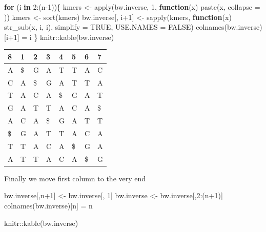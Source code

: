 \documentclass[
]{book}
\newenvironment{Shaded}{\begin{snugshade}}{\end{snugshade}}
\newcommand{\AttributeTok}[1]{\textcolor[rgb]{0.77,0.63,0.00}{#1}}
\newcommand{\ConstantTok}[1]{\textcolor[rgb]{0.00,0.00,0.00}{#1}}
\newcommand{\ControlFlowTok}[1]{\textcolor[rgb]{0.13,0.29,0.53}{\textbf{#1}}}
\newcommand{\DecValTok}[1]{\textcolor[rgb]{0.00,0.00,0.81}{#1}}
\newcommand{\FunctionTok}[1]{\textcolor[rgb]{0.00,0.00,0.00}{#1}}
\newcommand{\NormalTok}[1]{#1}
\newcommand{\OtherTok}[1]{\textcolor[rgb]{0.56,0.35,0.01}{#1}}
\newcommand{\SpecialCharTok}[1]{\textcolor[rgb]{0.00,0.00,0.00}{#1}}
\newcommand{\StringTok}[1]{\textcolor[rgb]{0.31,0.60,0.02}{#1}}
\begin{document}
\begin{Shaded}
\begin{Highlighting}[numbers=left,,]
\ControlFlowTok{for}\NormalTok{ (i }\ControlFlowTok{in} \DecValTok{2}\SpecialCharTok{:}\NormalTok{(n}\DecValTok{{-}1}\NormalTok{))\{}
\NormalTok{  kmers             }\OtherTok{\textless{}{-}} \FunctionTok{apply}\NormalTok{(bw.inverse, }\DecValTok{1}\NormalTok{, }
                             \ControlFlowTok{function}\NormalTok{(x) }\FunctionTok{paste}\NormalTok{(x, }\AttributeTok{collapse =} \StringTok{\textquotesingle{}\textquotesingle{}}\NormalTok{))}
\NormalTok{  kmers             }\OtherTok{\textless{}{-}} \FunctionTok{sort}\NormalTok{(kmers)}
\NormalTok{  bw.inverse[, i}\SpecialCharTok{+}\DecValTok{1}\NormalTok{] }\OtherTok{\textless{}{-}} \FunctionTok{sapply}\NormalTok{(kmers, }\ControlFlowTok{function}\NormalTok{(x) }\FunctionTok{str\_sub}\NormalTok{(x, i, i), }
                              \AttributeTok{simplify =} \ConstantTok{TRUE}\NormalTok{, }\AttributeTok{USE.NAMES =} \ConstantTok{FALSE}\NormalTok{)}
  \FunctionTok{colnames}\NormalTok{(bw.inverse)[i}\SpecialCharTok{+}\DecValTok{1}\NormalTok{] }\OtherTok{=}\NormalTok{ i}
\NormalTok{\}}
\NormalTok{knitr}\SpecialCharTok{::}\FunctionTok{kable}\NormalTok{(bw.inverse)}
\end{Highlighting}
\end{Shaded}

\begin{tabular}{l|l|l|l|l|l|l|l}
\hline
8 & 1 & 2 & 3 & 4 & 5 & 6 & 7\\
\hline
A & \$ & G & A & T & T & A & C\\
\hline
C & A & \$ & G & A & T & T & A\\
\hline
T & A & C & A & \$ & G & A & T\\
\hline
G & A & T & T & A & C & A & \$\\
\hline
A & C & A & \$ & G & A & T & T\\
\hline
\$ & G & A & T & T & A & C & A\\
\hline
T & T & A & C & A & \$ & G & A\\
\hline
A & T & T & A & C & A & \$ & G\\
\hline
\end{tabular}

Finally we move first column to the very end

\begin{Shaded}
\begin{Highlighting}[numbers=left,,]
\NormalTok{bw.inverse[,n}\SpecialCharTok{+}\DecValTok{1}\NormalTok{] }\OtherTok{\textless{}{-}}\NormalTok{ bw.inverse[, }\DecValTok{1}\NormalTok{]}
\NormalTok{bw.inverse       }\OtherTok{\textless{}{-}}\NormalTok{ bw.inverse[,}\DecValTok{2}\SpecialCharTok{:}\NormalTok{(n}\SpecialCharTok{+}\DecValTok{1}\NormalTok{)]}
\FunctionTok{colnames}\NormalTok{(bw.inverse)[n] }\OtherTok{=}\NormalTok{ n}

\NormalTok{knitr}\SpecialCharTok{::}\FunctionTok{kable}\NormalTok{(bw.inverse)}
\end{Highlighting}
\end{Shaded}
\end{document}
